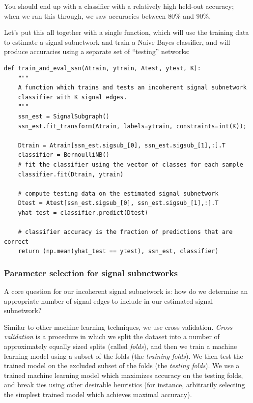 You should end up with a classifier with a relatively high held-out accuracy; when we ran this through, we saw accuracies between $80\%$ and $90\%$. 

Let's put this all together with a single function, which will use the training data to estimate a signal subnetwork and train a Naive Bayes classifier, and will produce accuracies using a separate set of ``testing'' networks:

\begin{lstlisting}[style=python]
def train_and_eval_ssn(Atrain, ytrain, Atest, ytest, K):
    """
    A function which trains and tests an incoherent signal subnetwork
    classifier with K signal edges.
    """
    ssn_est = SignalSubgraph()
    ssn_est.fit_transform(Atrain, labels=ytrain, constraints=int(K));

    Dtrain = Atrain[ssn_est.sigsub_[0], ssn_est.sigsub_[1],:].T
    classifier = BernoulliNB()
    # fit the classifier using the vector of classes for each sample
    classifier.fit(Dtrain, ytrain)

    # compute testing data on the estimated signal subnetwork
    Dtest = Atest[ssn_est.sigsub_[0], ssn_est.sigsub_[1],:].T
    yhat_test = classifier.predict(Dtest)
    
    # classifier accuracy is the fraction of predictions that are correct
    return (np.mean(yhat_test == ytest), ssn_est, classifier)
\end{lstlisting}

\subsubsection*{Parameter selection for signal subnetworks}

A core question for our incoherent signal subnetwork is: how do we determine an appropriate number of signal edges to include in our estimated signal subnetwork?

Similar to other machine learning techniques, we use cross validation. \textit{Cross validation} is a procedure in which we split the dataset into a number of approximately equally sized splits (called \textit{folds}), and then we train a machine learning model using a subset of the folds (the \textit{training folds}). We then test the trained model on the excluded subset of the folds (the \textit{testing folds}). We use a trained machine learning model which maximizes accuracy on the testing folds, and break ties using other desirable heuristics (for instance, arbitrarily selecting the simplest trained model which achieves maximal accuracy). 

